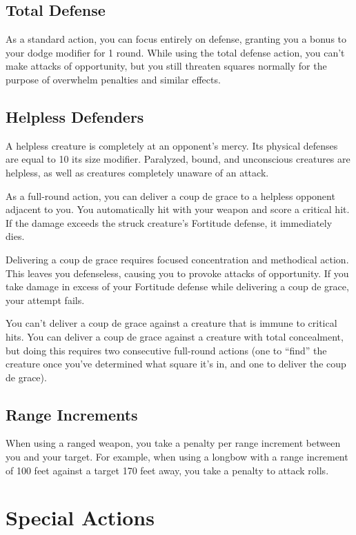 \subsection{Total Defense}\label{Total Defense}
As a standard action, you can focus entirely on defense, granting you a  bonus to your dodge modifier for 1 round. While using the total defense action, you can't make attacks of opportunity, but you still threaten squares normally for the purpose of overwhelm penalties and similar effects.

\subsection{Helpless Defenders}
A helpless creature is completely at an opponent's mercy. Its physical defenses are equal to 10 \add its size modifier. Paralyzed, bound, and unconscious creatures are helpless, as well as creatures completely unaware of an attack.

\label{Coup de Grace} As a full-round action, you can deliver a coup de grace to a helpless opponent adjacent to you. You automatically hit with your weapon and score a critical hit. If the damage exceeds the struck creature's Fortitude defense, it immediately dies.

Delivering a coup de grace requires focused concentration and methodical action. This leaves you defenseless, causing you to provoke attacks of opportunity. If you take damage in excess of your Fortitude defense while delivering a coup de grace, your attempt fails.

You can't deliver a coup de grace against a creature that is immune to critical hits. You can deliver a coup de grace against a creature with total concealment, but doing this requires two consecutive full-round actions (one to ``find'' the creature once you've determined what square it's in, and one to deliver the coup de grace).

\subsection{Range Increments}
When using a ranged weapon, you take a  penalty per range increment between you and your target. For example, when using a longbow with a range increment of 100 feet against a target 170 feet away, you take a  penalty to attack rolls.

\section{Special Actions}

